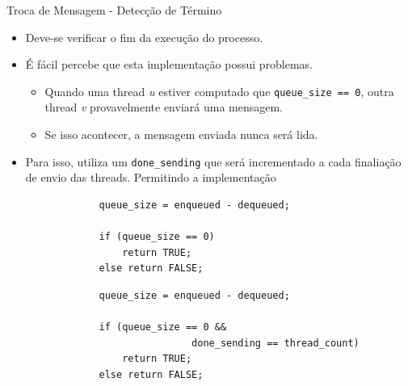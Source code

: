 	\begin{frame}[fragile]{Troca de Mensagem -  Detecção de Término}
		\begin{itemize}
			\item Deve-se verificar o fim da execução do processo.
		\end{itemize}


		\begin{multicols}{2}
			\begin{itemize}
				\item É fácil percebe que esta implementação possui problemas.
				\begin{itemize}
					\item Quando uma thread \textit{u} estiver computado que {\tt queue\_size == 0}, outra thread \textit{v} provavelmente enviará uma mensagem.
					\item Se isso acontecer, a mensagem enviada nunca será lida.
				\end{itemize}
				\item Para isso, utiliza um {\tt done\_sending} que será incrementado a cada finaliação de envio das threads. Permitindo a implementação
			\end{itemize}
		\columnbreak
			\begin{verbatim}
				queue_size = enqueued - dequeued; 

				if (queue_size == 0)
					return TRUE; 
				else return FALSE;
			\end{verbatim}
					\pause
			\begin{verbatim}
				queue_size = enqueued - dequeued; 

				if (queue_size == 0 && 
								done_sending == thread_count)
					return TRUE; 
				else return FALSE;
			\end{verbatim}
		\end{multicols}
\end{frame}



